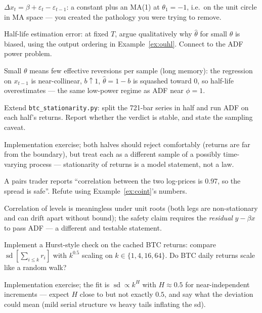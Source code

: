 \begin{solution}
$\Delta x_t=\beta+\varepsilon_t-\varepsilon_{t-1}$: a constant plus
an MA(1) at $\theta_1=-1$, i.e.\ on the unit circle in MA space ---
you created the pathology you were trying to remove.
\end{solution}
\begin{exercise}[hard]
Half-life estimation error: at fixed $T$, argue qualitatively why
$\hat\theta$ for small $\theta$ is biased, using the output ordering
in Example~\ref{ex:ouhl}. Connect to the ADF power problem.
\end{exercise}
\begin{solution}
Small $\theta$ means few effective reversions per sample (long
memory): the regression on $x_{t-1}$ is near-collinear, $b\uparrow1$,
$\hat\theta=1-b$ is squashed toward 0, so half-life overestimates ---
the same low-power regime as ADF near $\phi=1$.
\end{solution}
\begin{exercise}[hard]
Extend \texttt{btc\_stationarity.py}: split the 721-bar series in
half and run ADF on each half's returns. Report whether the verdict
is stable, and state the sampling caveat.
\end{exercise}
\begin{solution}
Implementation exercise; both halves should reject comfortably
(returns are far from the boundary), but treat each as a different
sample of a possibly time-varying process --- stationarity of
returns is a model statement, not a law.
\end{solution}
\begin{exercise}[hard]
A pairs trader reports ``correlation between the two log-prices is
0.97, so the spread is safe''. Refute using
Example~\ref{ex:coint}'s numbers.
\end{exercise}
\begin{solution}
Correlation of levels is meaningless under unit roots (both legs are
non-stationary and can drift apart without bound); the safety claim
requires the \emph{residual} $y-\beta x$ to pass ADF --- a different
and testable statement.
\end{solution}
\begin{exercise}[hard]
Implement a Hurst-style check on the cached BTC returns: compare
$\operatorname{sd}[\sum_{i\le k}r_i]$ with $k^{0.5}$ scaling on
$k\in\{1,4,16,64\}$. Do BTC daily returns scale like a random walk?
\end{exercise}
\begin{solution}
Implementation exercise; the fit is $\operatorname{sd}\propto k^H$
with $H\approx0.5$ for near-independent increments --- expect $H$
close to but not exactly $0.5$, and say what the deviation could
mean (mild serial structure vs heavy tails inflating the sd).
\end{solution}

